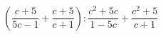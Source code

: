 \begin{ex}[type=expression]
	\begin{condition}
		\( \left( \dfrac{c+5}{5c-1}+\dfrac{c+5}{c+1} \right) :\dfrac{c^2+5c}{1-5c}+\dfrac{c^2+5}{c+1}\)
	\end{condition}
\end{ex}